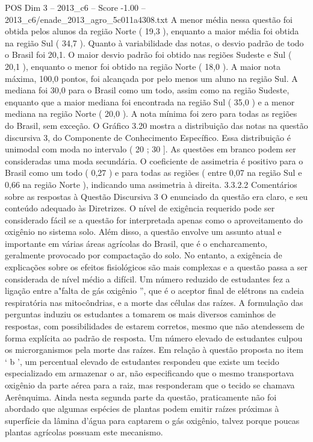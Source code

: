 \begin{textsample}{POS Dim 3 – 2013\_c6 – Score -1.00 – 2013\_c6/enade\_2013\_agro\_5c011a4308.txt}
A menor média nessa questão foi obtida pelos alunos da região Norte ( 19,3 ), enquanto a maior média foi obtida na região Sul ( 34,7 ).
Quanto à variabilidade das notas, o desvio padrão de todo o Brasil foi 20,1.
O maior desvio padrão foi obtido nas regiões Sudeste e Sul ( 20,1 ), enquanto o menor foi obtido na região Norte ( 18,0 ).
A maior nota máxima, 100,0 pontos, foi alcançada por pelo menos um aluno na região Sul.
A mediana foi 30,0 para o Brasil como um todo, assim como na região Sudeste, enquanto que a maior mediana foi encontrada na região Sul ( 35,0 ) e a menor mediana na região Norte ( 20,0 ).
A nota mínima foi zero para todas as regiões do Brasil, sem exceção.
O Gráfico 3.20 mostra a distribuição das notas na questão discursiva 3, do Componente de Conhecimento Específico.
Essa distribuição é unimodal com moda no intervalo ( 20 ; 30 ].
As questões em branco podem ser consideradas uma moda secundária.
O coeficiente de assimetria é positivo para o Brasil como um todo ( 0,27 ) e para todas as regiões ( entre 0,07 na região Sul e 0,66 na região Norte ), indicando uma assimetria à direita. 3.3.2.2 Comentários sobre as respostas à Questão Discursiva 3 O enunciado da questão era claro, e seu conteúdo adequado às Diretrizes.
O nível de exigência requerido pode ser considerado fácil se a questão for interpretada apenas como o aproveitamento do oxigênio no sistema solo.
Além disso, a questão envolve um assunto atual e importante em várias áreas agrícolas do Brasil, que é o encharcamento, geralmente provocado por compactação do solo.
No entanto, a exigência de explicações sobre os efeitos fisiológicos são mais complexas e a questão passa a ser considerada de nível médio a difícil.
Um número reduzido de estudantes fez a ligação entre a"falta de gás oxigênio ”, que é o aceptor final de elétrons na cadeia respiratória nas mitocôndrias, e a morte das células das raízes.
A formulação das perguntas induziu os estudantes a tomarem os mais diversos caminhos de respostas, com possibilidades de estarem corretos, mesmo que não atendessem de forma explícita ao padrão de resposta.
Um número elevado de estudantes culpou os microrganismos pela morte das raízes.
Em relação à questão proposta no item ‘ b ’, um percentual elevado de estudantes respondeu que existe um tecido especializado em armazenar o ar, não especificando que o mesmo transportava oxigênio da parte aérea para a raiz, mas responderam que o tecido se chamava Aerênquima.
Ainda nesta segunda parte da questão, praticamente não foi abordado que algumas espécies de plantas podem emitir raízes próximas à superfície da lâmina d'água para captarem o gás oxigênio, talvez porque poucas plantas agrícolas possuam este mecanismo.

\end{textsample}
